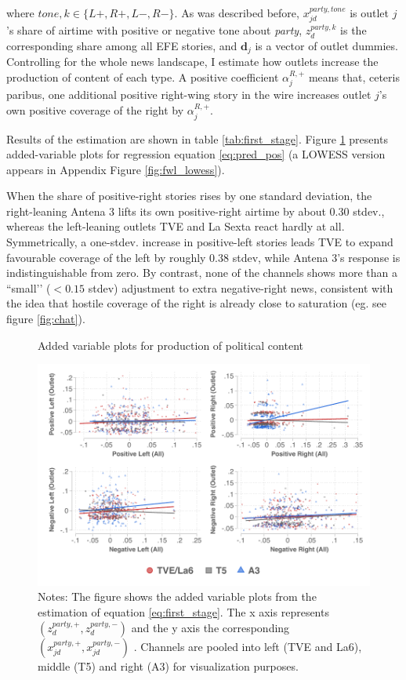 \documentclass[12pt]{article}
\begin{document}
where $tone,k \in\{L+,R+,L-,R-\}$. As was described before,  $x^{party, tone}_{jd}$ is outlet $j$’s share of airtime with positive or negative tone about \emph{party}, $z^{party,k}_d$ is the corresponding share among all EFE stories, and $\bm d_j$ is a vector of outlet dummies.  Controlling for the whole news landscape, I estimate how outlets increase the production of content of each type. 
A positive coefficient $\alpha_{j}^{R,+}$ means that, ceteris paribus, one additional positive right-wing story in the wire increases outlet $j$’s own positive coverage of the right by $\alpha_{j}^{R,+}$.

Results of the estimation are shown in table \ref{tab:first_stage}. Figure \ref{fig:fwl} presents added-variable plots for regression equation  \eqref{eq:pred_pos} (a LOWESS version appears in Appendix Figure \ref{fig:fwl_lowess}).  

 When the share of  positive-right stories rises by one standard deviation, the right-leaning Antena 3 lifts its own positive-right airtime by about 0.30 stdev., whereas the left-leaning outlets TVE and La Sexta react hardly at all.  Symmetrically, a one-stdev. increase in positive-left stories leads TVE to expand favourable coverage of the left by roughly 0.38 stdev, while Antena 3’s response is indistinguishable from zero.  By contrast, none of the channels shows more than a “small’’ (\(<0.15\) stdev) adjustment to extra negative-right news, consistent with the idea that hostile coverage of the right is already close to saturation (eg. see figure \ref{fig:chat}).


	
	
		\begin{figure}[h!]
		\centering
\caption{Added variable plots for production of political content}
		\includegraphics[width=160mm]{figures/fwl_plots}
		\caption*{\small Notes: The figure shows the added variable plots from the estimation of equation \ref{eq:first_stage}. The x axis represents $\left(z_d^{party,+},z_d^{party,-}\right) $ and the y axis the corresponding  $\left(x_{jd}^{party,+},x_{jd}^{party,-}\right) $   . Channels are pooled into left (TVE and La6), middle (T5) and right (A3) for visualization purposes.  }
		\label{fig:fwl}
	\end{figure}
	
\end{document}
